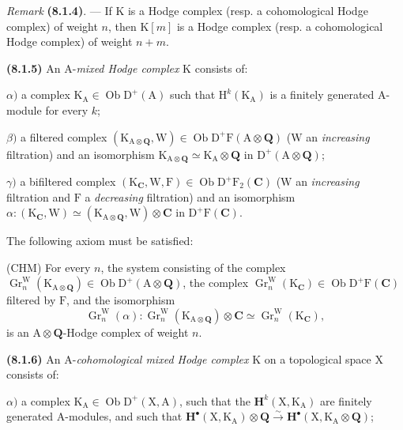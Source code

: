 \documentclass[11pt,leqno]{article}
\begin{document}
\textit{Remark} \textbf{(8.1.4)}. — If \(\mathrm{K}\) is a Hodge complex (resp. a cohomological Hodge complex) of weight \(n\), then \(\mathrm{K}[m]\) is a Hodge complex (resp. a cohomological Hodge complex) of weight \(n+m\).

\textbf{(8.1.5)} An \(\mathrm{A}\)-\textit{mixed Hodge complex} \(\mathrm{K}\) consists of:

\(\alpha)\) a complex \(\mathrm{K}_{\mathrm{A}}\in\operatorname{Ob}\mathrm{D}^{+}(\mathrm{A})\) such that \(\mathrm{H}^{k}(\mathrm{K}_{\mathrm{A}})\) is a finitely generated \(\mathrm{A}\)-module for every \(k\);

\(\beta)\) a filtered complex \((\mathrm{K}_{\mathrm{A}\otimes\mathbf{Q}},\mathrm{W})\in\operatorname{Ob}\mathrm{D}^{+}\mathrm{F}(\mathrm{A}\otimes\mathbf{Q})\) (\(\mathrm{W}\) an \textit{increasing} filtration) and an isomorphism \(\mathrm{K}_{\mathrm{A}\otimes\mathbf{Q}}\simeq\mathrm{K}_{\mathrm{A}}\otimes\mathbf{Q}\) in \(\mathrm{D}^{+}(\mathrm{A}\otimes\mathbf{Q})\);

\(\gamma)\) a bifiltered complex \((\mathrm{K}_{\mathbf{C}},\mathrm{W},\mathrm{F})\in\operatorname{Ob}\mathrm{D}^{+}\mathrm{F}_{2}(\mathbf{C})\) (\(\mathrm{W}\) an \textit{increasing} filtration and \(\mathrm{F}\) a \textit{decreasing} filtration) and an isomorphism \(\alpha:(\mathrm{K}_{\mathbf{C}},\mathrm{W})\simeq(\mathrm{K}_{\mathrm{A}\otimes\mathbf{Q}},\mathrm{W})\otimes\mathbf{C}\) in \(\mathrm{D}^{+}\mathrm{F}(\mathbf{C})\).

The following axiom must be satisfied:

(CHM) For every \(n\), the system consisting of the complex \(\operatorname{Gr}_{n}^{\mathrm{W}}(\mathrm{K}_{\mathrm{A}\otimes\mathbf{Q}})\in\operatorname{Ob}\mathrm{D}^{+}(\mathrm{A}\otimes\mathbf{Q})\), the complex \(\operatorname{Gr}_{n}^{\mathrm{W}}(\mathrm{K}_{\mathbf{C}})\in\operatorname{Ob}\mathrm{D}^{+}\mathrm{F}(\mathbf{C})\) filtered by \(\mathrm{F}\), and the isomorphism
\[
\operatorname{Gr}_{n}^{\mathrm{W}}(\alpha):
\operatorname{Gr}_{n}^{\mathrm{W}}(\mathrm{K}_{\mathrm{A}\otimes\mathbf{Q}})\otimes\mathbf{C}
\simeq
\operatorname{Gr}_{n}^{\mathrm{W}}(\mathrm{K}_{\mathbf{C}}),
\]
is an \(\mathrm{A}\otimes\mathbf{Q}\)-Hodge complex of weight \(n\).

\textbf{(8.1.6)} An \(\mathrm{A}\)-\textit{cohomological mixed Hodge complex} \(\mathrm{K}\) on a topological space \(\mathrm{X}\) consists of:

\(\alpha)\) a complex \(\mathrm{K}_{\mathrm{A}}\in\operatorname{Ob}\mathrm{D}^{+}(\mathrm{X},\mathrm{A})\), such that the \(\mathbf{H}^{k}(\mathrm{X},\mathrm{K}_{\mathrm{A}})\) are finitely generated \(\mathrm{A}\)-modules, and such that \(\mathbf{H}^{\bullet}(\mathrm{X},\mathrm{K}_{\mathrm{A}})\otimes\mathbf{Q}\xrightarrow{\sim}\mathbf{H}^{\bullet}(\mathrm{X},\mathrm{K}_{\mathrm{A}}\otimes\mathbf{Q})\);
\end{document}

